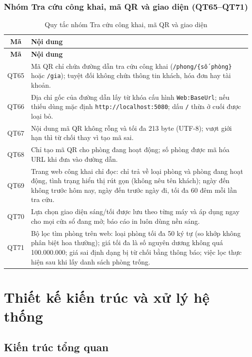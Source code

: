 \documentclass[14pt]{report}
\begin{document}
\subsection{Nhóm Tra cứu công khai, mã QR và giao diện (QT65--QT71)}

\begin{longtable}{|c|p{12cm}|}
\caption{Quy tắc nhóm Tra cứu công khai, mã QR và giao diện}\\\hline
\textbf{Mã} & \textbf{Nội dung}\\\hline
\endfirsthead
\hline \textbf{Mã} & \textbf{Nội dung}\\\hline
\endhead
QT65 & Mã QR chỉ chứa đường dẫn tra cứu công khai (\texttt{/phong/\{số phòng\}} hoặc \texttt{/gia}); tuyệt đối không chứa thông tin khách, hóa đơn hay tài khoản. \\\hline
QT66 & Địa chỉ gốc của đường dẫn lấy từ khóa cấu hình \texttt{Web:BaseUrl}; nếu thiếu dùng mặc định \texttt{http://localhost:5080}; dấu \texttt{/} thừa ở cuối được loại bỏ. \\\hline
QT67 & Nội dung mã QR không rỗng và tối đa 213 byte (UTF-8); vượt giới hạn thì từ chối thay vì tạo mã sai. \\\hline
QT68 & Chỉ tạo mã QR cho phòng đang hoạt động; số phòng được mã hóa URL khi đưa vào đường dẫn. \\\hline
QT69 & Trang web công khai chỉ đọc: chỉ trả về loại phòng và phòng đang hoạt động, tình trạng hiển thị rút gọn (không nêu tên khách); ngày đến không trước hôm nay, ngày đến trước ngày đi, tối đa 60 đêm mỗi lần tra cứu. \\\hline
QT70 & Lựa chọn giao diện sáng/tối được lưu theo từng máy và áp dụng ngay cho mọi cửa sổ đang mở; báo cáo in luôn dùng nền sáng. \\\hline
QT71 & Bộ lọc tìm phòng trên web: loại phòng tối đa 50 ký tự (so khớp không phân biệt hoa thường); giá tối đa là số nguyên dương không quá 100.000.000; giá sai định dạng bị từ chối bằng thông báo; việc lọc thực hiện sau khi lấy danh sách phòng trống. \\\hline
\end{longtable}


\chapter{Thiết kế kiến trúc và xử lý hệ thống}

\section{Kiến trúc tổng quan}
\end{document}
